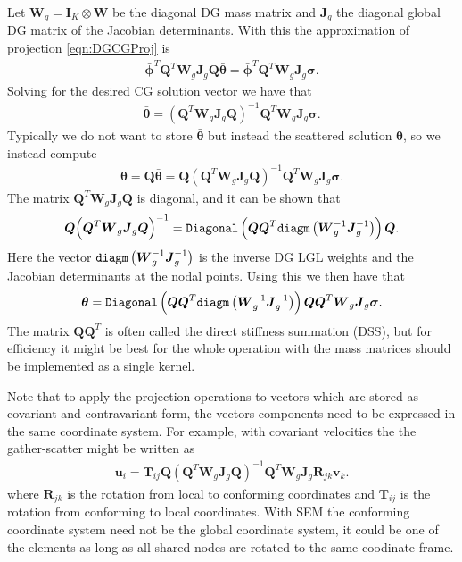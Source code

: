 \documentclass{report}
\newcommand{\mat}[1]{\boldsymbol #1}
\newcommand{\dvec}[1]{\boldsymbol #1}
\begin{document}
Let $\mat{W}_g = \mat{I}_{K} \otimes \mat{W}$ be the diagonal DG mass matrix
and $\mat{J}_{g}$ the diagonal global DG matrix of the Jacobian determinants.
With this the approximation of projection \eqref{eqn:DGCGProj} is
\begin{align}
   \bar{\dvec{\phi}}^{T} \mat{Q}^{T} \mat{W}_{g} \mat{J}_{g} \mat{Q} \bar{\dvec{\theta}}
   =
   \bar{\dvec{\phi}}^{T} \mat{Q}^{T} \mat{W}_{g} \mat{J}_{g} \dvec{\sigma}.
\end{align}
Solving for the desired CG solution vector we have that
\begin{align}
   \bar{\dvec{\theta}}
   =
   {\left(\mat{Q}^{T} \mat{W}_{g} \mat{J}_{g} \mat{Q}\right)}^{-1}
   \mat{Q}^{T} \mat{W}_{g} \mat{J}_{g} \dvec{\sigma}.
\end{align}
Typically we do not want to store $\bar{\dvec{\theta}}$ but instead the scattered solution
$\dvec{\theta}$, so we instead compute
\begin{align}
   \dvec{\theta}
   =
   \mat{Q} \bar{\dvec{\theta}}
   =
   \mat{Q} {\left(\mat{Q}^{T} \mat{W}_{g} \mat{J}_{g} \mat{Q}\right)}^{-1}
   \mat{Q}^{T} \mat{W}_{g} \mat{J}_{g} \dvec{\sigma}.
\end{align}
The matrix $\mat{Q}^{T} \mat{W}_{g} \mat{J}_{g} \mat{Q}$ is diagonal, and it can be shown that
\begin{align}
   \mat{Q} {\left(\mat{Q}^{T} \mat{W}_{g} \mat{J}_{g} \mat{Q}\right)}^{-1}
   = \text{\tt Diagonal}\left(\mat{Q} \mat{Q}^{T}
   \text{\tt diagm}\left(\mat{W}_{g}^{-1} \mat{J}_{g}^{-1}\right)\right) \mat{Q}.
\end{align}
Here the vector $\text{\tt diagm}\left(\mat{W}_{g}^{-1} \mat{J}_{g}^{-1}\right)$
is the inverse DG LGL weights and the Jacobian determinants at the nodal points. Using this we then have that
\begin{align}
   \dvec{\theta}
   =
   \text{\tt Diagonal}\left(\mat{Q} \mat{Q}^{T} \text{\tt diagm}\left(\mat{W}_{g}^{-1} \mat{J}_{g}^{-1}\right)\right) \mat{Q}\mat{Q}^{T} \mat{W}_{g} \mat{J}_{g} \dvec{\sigma}.
\end{align}
The matrix $\mat{Q} \mat{Q}^{T}$ is often called the direct stiffness summation (DSS),
but for efficiency it might be best for the whole operation with the mass matrices should be
implemented as a single kernel.

Note that to apply the projection operations to vectors which are stored as covariant and contravariant form,
the vectors components need to be expressed in the same
coordinate system. For example, with covariant velocities the the gather-scatter might be written as
\begin{align}
   \dvec{u}_{i}
   =
   \mat{T}_{ij}
   \mat{Q} {\left(\mat{Q}^{T} \mat{W}_{g} \mat{J}_{g} \mat{Q}\right)}^{-1}
   \mat{Q}^{T} \mat{W}_{g} \mat{J}_{g} \mat{R}_{jk}\dvec{v}_{k}.
\end{align}
where $\mat{R}_{jk}$ is the rotation from local to conforming coordinates and
$\mat{T}_{ij}$ is the rotation from conforming to local coordinates. With SEM the conforming
coordinate system need not be the global coordinate system, it could be one of the elements
as long as all shared nodes are rotated to the same coodinate frame.
\end{document}
